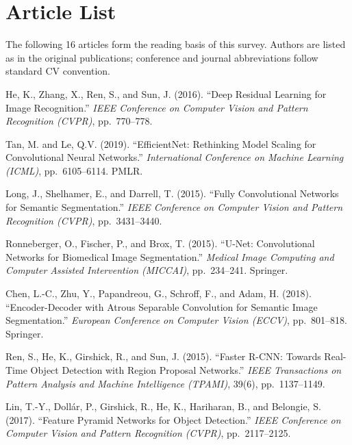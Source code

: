 \documentclass[12pt,a4paper]{article}
\begin{document}
\section{Article List}
\label{sec:articles}

The following 16 articles form the reading basis of this survey. Authors are listed as in the original publications; conference and journal abbreviations follow standard CV convention.

\begin{enumerate}[leftmargin=*, label={[\arabic*]}]

  \item He, K., Zhang, X., Ren, S., and Sun, J. (2016). ``Deep Residual Learning for Image Recognition.'' \textit{IEEE Conference on Computer Vision and Pattern Recognition (CVPR)}, pp.\ 770--778.

  \item Tan, M. and Le, Q.V. (2019). ``EfficientNet: Rethinking Model Scaling for Convolutional Neural Networks.'' \textit{International Conference on Machine Learning (ICML)}, pp.\ 6105--6114. PMLR.

  \item Long, J., Shelhamer, E., and Darrell, T. (2015). ``Fully Convolutional Networks for Semantic Segmentation.'' \textit{IEEE Conference on Computer Vision and Pattern Recognition (CVPR)}, pp.\ 3431--3440.

  \item Ronneberger, O., Fischer, P., and Brox, T. (2015). ``U-Net: Convolutional Networks for Biomedical Image Segmentation.'' \textit{Medical Image Computing and Computer Assisted Intervention (MICCAI)}, pp.\ 234--241. Springer.

  \item Chen, L.-C., Zhu, Y., Papandreou, G., Schroff, F., and Adam, H. (2018). ``Encoder-Decoder with Atrous Separable Convolution for Semantic Image Segmentation.'' \textit{European Conference on Computer Vision (ECCV)}, pp.\ 801--818. Springer.

  \item Ren, S., He, K., Girshick, R., and Sun, J. (2015). ``Faster R-CNN: Towards Real-Time Object Detection with Region Proposal Networks.'' \textit{IEEE Transactions on Pattern Analysis and Machine Intelligence (TPAMI)}, 39(6), pp.\ 1137--1149.

  \item Lin, T.-Y., Doll{\'a}r, P., Girshick, R., He, K., Hariharan, B., and Belongie, S. (2017). ``Feature Pyramid Networks for Object Detection.'' \textit{IEEE Conference on Computer Vision and Pattern Recognition (CVPR)}, pp.\ 2117--2125.


\end{enumerate}
\end{document}
